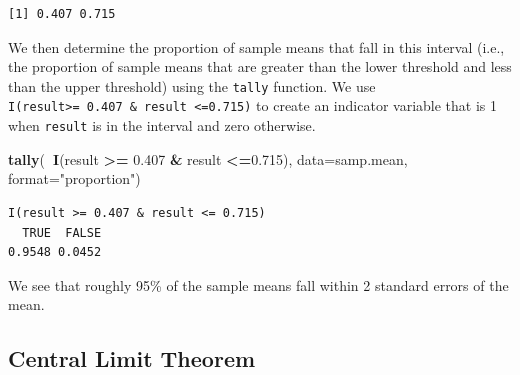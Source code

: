 \documentclass[fleqn,10pt]{wlpeerj} %
\newenvironment{Shaded}{\begin{snugshade}}{\end{snugshade}}
\newcommand{\DataTypeTok}[1]{\textcolor[rgb]{0.13,0.29,0.53}{#1}}
\newcommand{\FloatTok}[1]{\textcolor[rgb]{0.00,0.00,0.81}{#1}}
\newcommand{\KeywordTok}[1]{\textcolor[rgb]{0.13,0.29,0.53}{\textbf{#1}}}
\newcommand{\NormalTok}[1]{#1}
\newcommand{\OperatorTok}[1]{\textcolor[rgb]{0.81,0.36,0.00}{\textbf{#1}}}
\newcommand{\StringTok}[1]{\textcolor[rgb]{0.31,0.60,0.02}{#1}}
\begin{document}
\begin{verbatim}
[1] 0.407 0.715
\end{verbatim}

We then determine the proportion of sample means that fall in this interval (i.e., the proportion of sample means that are greater than the lower threshold and less than the upper threshold) using the \texttt{tally} function. We use \texttt{I(result\textgreater{}=\ 0.407\ \&\ result\ \textless{}=0.715)} to create an indicator variable that is 1 when \texttt{result} is in the interval and zero otherwise.

\begin{Shaded}
\begin{Highlighting}[]
\KeywordTok{tally}\NormalTok{(}\OperatorTok{~}\KeywordTok{I}\NormalTok{(result }\OperatorTok{>=}\StringTok{ }\FloatTok{0.407} \OperatorTok{&}\StringTok{ }\NormalTok{result }\OperatorTok{<=}\FloatTok{0.715}\NormalTok{), }
      \DataTypeTok{data=}\NormalTok{samp.mean, }\DataTypeTok{format=}\StringTok{"proportion"}\NormalTok{)  }
\end{Highlighting}
\end{Shaded}

\begin{verbatim}
I(result >= 0.407 & result <= 0.715)
  TRUE  FALSE 
0.9548 0.0452 
\end{verbatim}

We see that roughly 95\% of the sample means fall within 2 standard errors of the mean.

\hypertarget{central-limit-theorem}{%
\subsection*{Central Limit Theorem}\label{central-limit-theorem}}
\end{document}
